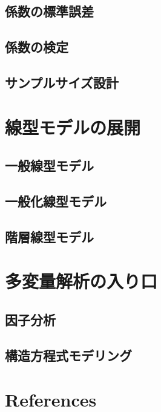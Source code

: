 \documentclass[
  a4paper,
]{ltjsbook}
\begin{document}
\section{係数の標準誤差}\label{ux4fc2ux6570ux306eux6a19ux6e96ux8aa4ux5dee}

\section{係数の検定}\label{ux4fc2ux6570ux306eux691cux5b9a}

\section{サンプルサイズ設計}\label{ux30b5ux30f3ux30d7ux30ebux30b5ux30a4ux30baux8a2dux8a08}


\chapter{線型モデルの展開}\label{ux7ddaux578bux30e2ux30c7ux30ebux306eux5c55ux958b}

\section{一般線型モデル}\label{ux4e00ux822cux7ddaux578bux30e2ux30c7ux30eb}

\section{一般化線型モデル}\label{ux4e00ux822cux5316ux7ddaux578bux30e2ux30c7ux30eb}

\section{階層線型モデル}\label{ux968eux5c64ux7ddaux578bux30e2ux30c7ux30eb}


\chapter{多変量解析の入り口}\label{ux591aux5909ux91cfux89e3ux6790ux306eux5165ux308aux53e3}

\section{因子分析}\label{ux56e0ux5b50ux5206ux6790}

\section{構造方程式モデリング}\label{ux69cbux9020ux65b9ux7a0bux5f0fux30e2ux30c7ux30eaux30f3ux30b0}


\chapter*{References}\label{references}


\printbibliography[heading=none]
\end{document}
